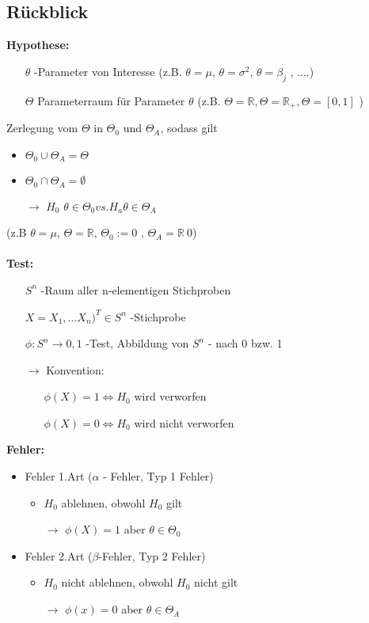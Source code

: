 \subsection{Rückblick}
\textbf{Hypothese:} \begin{itemize}
	\item [$\theta$] -Parameter von Interesse (z.B. $\theta = \mu$, $\theta = \sigma^2$, $ \theta = \beta_j $ , ....)
	\item[$\Theta$] Parameterraum für Parameter $\theta$ (z.B. $ \Theta = \mathbb{R}, \Theta = \mathbb{R}_+, \Theta= [0,1] $ ) 
\end{itemize}
Zerlegung vom $ \Theta $ in $ \Theta_0 $ und $ \Theta_A $, sodass gilt
\begin{itemize}
	\item $ \Theta_0 \cup \Theta_A = \Theta $
	\item $ \Theta_0 \cap \Theta_A = \emptyset $
	\item[$ \rightarrow $] $H_0$ $\theta \in \Theta_0 vs. H_a \theta \in \Theta_A $
\end{itemize}
(z.B $ \theta = \mu $,  $ \Theta = \mathbb{R} $, $ \Theta_0 := {0} $ , $ \Theta_A = \mathbb{R} \ {0} $)\\\\
\textbf{Test:} 
\begin{itemize}
	\item[] $ S^n $  -Raum aller n-elementigen Stichproben
	\item[] $ X = X_1,\ldots X_n)^T \in S^n $  -Stichprobe
	\item[] $ \phi : S^n \rightarrow {0,1} $ -Test, Abbildung von $ S^n $ - nach 0 bzw. 1
\item[$ \rightarrow $] Konvention: 
\begin{itemize}
	\item[]$ \phi(X) = 1 \Leftrightarrow H_0 $ wird verworfen
	\item[]$ \phi(X) = 0 \Leftrightarrow H_0 $ wird nicht verworfen
\end{itemize}
\end{itemize}
\textbf{Fehler:} 
\begin{itemize}
	\item Fehler 1.Art ($\alpha$ - Fehler, Typ 1 Fehler)
	\begin{itemize}
		\item $H_0$ ablehnen, obwohl $H_0$ gilt
		\item[$\rightarrow $] $\phi(X)=1$ aber $\theta \in \Theta_0$
	\end{itemize}	
	\item Fehler 2.Art ($\beta$-Fehler, Typ 2 Fehler)
	\begin{itemize}
		\item $H_0$ nicht ablehnen, obwohl $H_0$ nicht gilt
		\item[$\rightarrow$] $\phi(x) = 0$ aber $\theta \in \Theta_A$
	\end{itemize}
\end{itemize}
